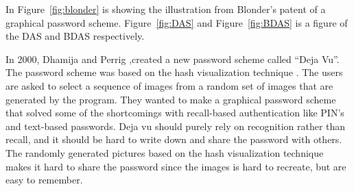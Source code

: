   In Figure~\ref{fig:blonder} is showing the illustration from Blonder's patent of a graphical password scheme. Figure~\ref{fig:DAS} and Figure~\ref{fig:BDAS} is a figure of the DAS and BDAS respectively.

  \begin{figure}[H]
    \centering
  \end{figure}

  In 2000, Dhamija and Perrig \cite{DejaVu},created a new password scheme called ``Deja Vu''. The password scheme was based on the hash visualization technique \cite{HashVisualization}. The users are asked to select a sequence of images from a random set of images that are generated by the program. They wanted to make a graphical password scheme that solved some of the shortcomings with recall-based authentication like PIN's and text-based passwords. Deja vu should purely rely on recognition rather than recall, and it should be hard to write down and share the password with others. The randomly generated pictures based on the hash visualization technique makes it hard to share the password since the images is hard to recreate, but are easy to remember.

